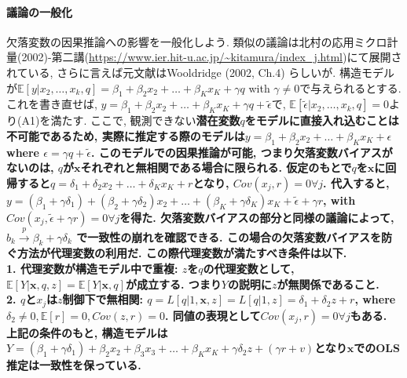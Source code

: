 \documentclass[paper=a4paper,fontsize=10pt]{jlreq}
\begin{document}
\paragraph{議論の一般化}
欠落変数の因果推論への影響を一般化しよう. 類似の議論は北村の応用ミクロ計量(2002)-第二講(\url{https://www.ier.hit-u.ac.jp/~kitamura/index_j.html})にて展開されている, さらに言えば元文献はWooldridge (2002, Ch.4) らしいが. 構造モデルが$\mathbb{E}[y|x_2, \dots, x_k, q]=\beta_1+\beta_2x_2+\dots+\beta_Kx_K+\gamma q$ with $\gamma \neq 0$で与えられるとする. これを書き直せば, $y=\beta_1+\beta_2x_2+\dots+\beta_Kx_K+\gamma q+\tilde{\epsilon}$で, $\mathbb{E}[\tilde{\epsilon}|x_2, \dots, x_k, q]=0$より(A1)を満たす. ここで, 観測できない\rmfamily\mcfamily\bfseries{潜在変数}\mdseries $q$をモデルに直接入れ込むことは不可能であるため, 実際に推定する際のモデルは$y=\beta_1+\beta_2x_2+\dots+\beta_Kx_K+\epsilon$ where $\epsilon = \gamma q+\tilde{\epsilon}$. このモデルでの因果推論が可能, つまり欠落変数バイアスがないのは, $q$が$\mathbf{x}$それぞれと無相関である場合に限られる. 仮定のもとで$q$を$\mathbf{x}$に回帰すると$q=\delta_1+\delta_2x_2+\dots+\delta_Kx_K+r$となり, $Cov(x_j, r)=0 \forall j$. 代入すると, $y=(\beta_1+\gamma \delta_1)+(\beta_2+\gamma \delta_2)x_2+\dots+(\beta_K+\gamma \delta_K)x_K+\tilde{\epsilon}+\gamma r$, with $Cov(x_j,\tilde{\epsilon}+\gamma r)=0 \forall j$を得た. 欠落変数バイアスの部分と同様の議論によって, $b_k \overset{p}{\to} \beta_k +\gamma \delta_k$ で一致性の崩れを確認できる. この場合の欠落変数バイアスを防ぐ方法が\rmfamily\mcfamily\bfseries{代理変数}\mdseries の利用だ. この際代理変数が満たすべき条件は以下.\\

\rmfamily\mcfamily\bfseries{1. 代理変数が構造モデル中で重複}\mdseries : $z$を$q$の代理変数として, $\mathbb{E}[Y|\mathbf{x},q,z]=\mathbb{E}[Y|\mathbf{x},q]$が成立する. つまり$Y$の説明に$z$が無関係であること.\\

\rmfamily\mcfamily\bfseries{2. $q$と$x_j$は$z$制御下で無相関}\mdseries : $q=L[q|1, \mathbf{x}, z]=L[q|1, z]=\delta_1 + \delta_2z+r$, where $\delta_2\neq 0, \mathbb{E}[r]=0, Cov(z, r)=0$. 同値の表現として$Cov(x_j, r)=0 \forall j$もある.\\

上記の条件のもと, 構造モデルは$Y=(\beta_1+\gamma\delta_1)+\beta_2x_2+\beta_3x_3+\dots+\beta_Kx_K+\gamma\delta_2z+(\gamma r + v)$となり$\mathbf{x}$でのOLS推定は一致性を保っている.\\
\end{document}
